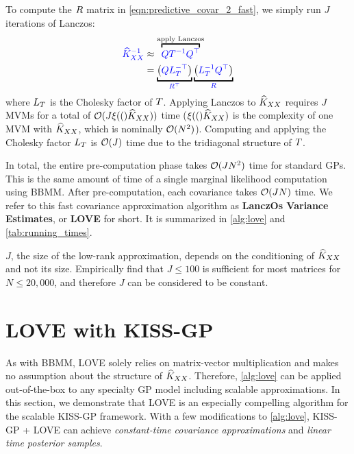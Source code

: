 To compute the $R$ matrix in \cref{eqn:predictive_covar_2_fast}, we simply run $J$ iterations of Lanczos:
\begin{align*}
  {\color{blue} \trainK^{-1}} &\approx \overbracket{\color{blue} \bQ \bT^{-1} \bQ^\top}^{\text{apply Lanczos}}
  \\
  &=
  \underbracket{ \left( {\color{blue} \bQ \bL_\bT^{-\top}} \right)}_{\color{blue} \bR^\top}
  \underbracket{ \left( {\color{blue} \bL_\bT^{-1} \bQ^\top} \right)}_{\color{blue} \bR}
\end{align*}
%
where $L_{T}$ is the Cholesky factor of $T$.
Applying Lanczos to $\widehat{K}_{XX}$ requires $J$ MVMs for a total of $\bigo{J \mvm(\trainK)}$ time ($\xi ( ( )\widehat{K}_{XX})$ is the complexity of one MVM with $\widehat{K}_{XX}$, which is nominally $\bigo{N^2}$).
Computing and applying the Cholesky factor $L_{T}$ is $\bigo{J}$ time due to the tridiagonal structure of $T$.

In total, the entire pre-computation phase takes $\bigo{J N^2}$ time for standard GPs.
This is the same amount of time of a single marginal likelihood computation using BBMM.
After pre-computation, each covariance takes $\bigo{JN}$ time.
We refer to this fast covariance approximation algorithm as {\bf LanczOs Variance Estimates}, or {\bf LOVE} for short.
It is summarized in \cref{alg:love} and \cref{tab:running_times}.

$J$, the size of the low-rank approximation, depends on the conditioning of $\widehat{K}_{XX}$ and not its size.
Empirically find that $J\leq100$ is sufficient for most matrices for $N \leq 20,\!000$, and therefore $J$ can be considered to be constant.



\section{LOVE with KISS-GP}



As with BBMM, LOVE solely relies on matrix-vector multiplication and makes no assumption about the structure of $\widehat{K}_{XX}$.
Therefore, \cref{alg:love} can be applied out-of-the-box to any specialty GP model including scalable approximations.
In this section, we demonstrate that LOVE is an especially compelling algorithm for the scalable KISS-GP framework.
With a few modifications to \cref{alg:love}, KISS-GP + LOVE can achieve \emph{constant-time covariance approximations} and \emph{linear time posterior samples}.

